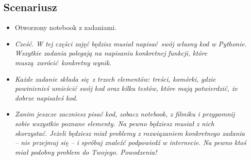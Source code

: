 \documentclass{mwart}
\begin{document}
\subsection{Scenariusz}
\begin{itemize}
  \item Otworzony notebook z zadaniami.
  \item \emph{Cześć. W tej części zajęć będzisz musiał napisać swój własny kod w
      Pythonie. Wszytkie zadania polegają na napisaniu konkretnej funkcji, które
      muszą zwrócić konkretny wynik.}
  \item \emph{Każde zadanie składa się z trzech elementów: treści, komórki, gdzie
      powinienieś umieścić swój kod oraz kilku testów, które mają potwierdzić, że dobrze
      napisałeś kod.}
  \item \emph{Zanim jeszcze zaczniesz pisać kod, zobacz notebook, z filmiku i przypomnij
      sobie wszystkie poznane elementy. Na pewno będziesz musiał z nich skorzystać.
      Jeżeli będziesz miał problemy z rozwiązaniem konkretnego zadania -- nie przejmuj
      się -- i spróbuj znaleźć podpowiedź w internecie. Na pewno ktoś miał podobny
      problem do Twojego. Powodzenia!}
\end{itemize}
\end{document}
